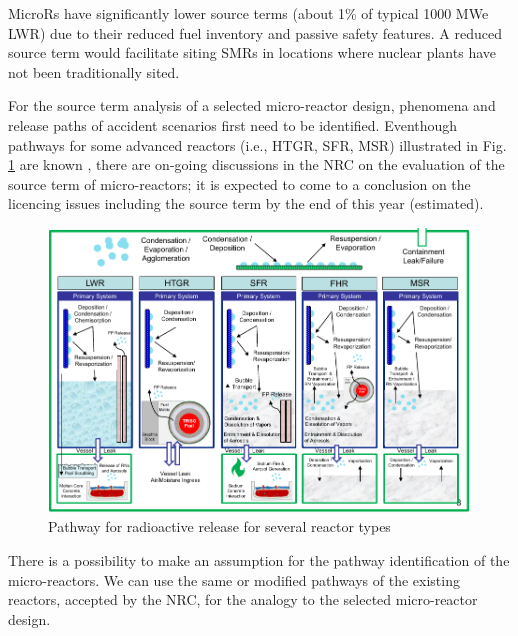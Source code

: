 \documentclass[10pt,a4paper]{article}
\begin{document}
MicroRs have significantly lower source terms (about 1\% of typical 1000 MWe LWR) due to their reduced fuel inventory and passive safety features. A reduced source term would facilitate siting SMRs in locations where nuclear plants have not been traditionally sited.

For the source term analysis of a selected micro-reactor design, phenomena and release paths of accident scenarios first need to be identified. Eventhough pathways for some advanced reactors (i.e., HTGR, \gls{SFR}, MSR) illustrated in Fig. \ref{pathway} are known  \cite{noauthor_htgr_2010}, there are on-going discussions in the NRC on the evaluation of the source term of micro-reactors; it is expected to come to a conclusion on the licencing issues including the source term by the end of this year (estimated). 

\begin{figure}[hbtp]
\centering
\includegraphics[scale=0.6]{Figs/pathway.jpeg}
\caption{Pathway for radioactive release for several reactor types}
\label{pathway}
\end{figure}

There is a possibility to make an assumption for the pathway identification of the micro-reactors. We can use the same or modified pathways of the existing reactors, accepted by the NRC, for the analogy to the selected micro-reactor design. 
\end{document}
